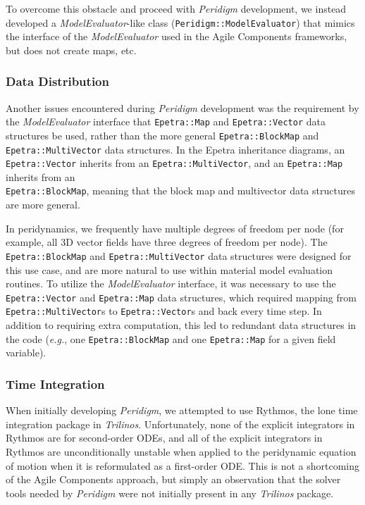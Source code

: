\documentclass[pdf,ps2pdf,12pt,report]{SANDreport}
\theoremstyle{plain}
\theoremstyle{definition}
\theoremstyle{remark}
\numberwithin{equation}{section}
\begin{document}
To overcome this obstacle and proceed with \emph{Peridigm} development, we instead developed a \emph{ModelEvaluator}-like class (\verb"Peridigm::ModelEvaluator") that mimics the interface of the \emph{ModelEvaluator} used in the Agile Components frameworks, but does not create maps, etc.

\subsubsection{Data Distribution}

Another issues encountered during \emph{Peridigm} development was the requirement by the \emph{ModelEvaluator} interface that \verb"Epetra::Map" and \verb"Epetra::Vector" data structures be used, rather than the more general \verb"Epetra::BlockMap" and \verb"Epetra::MultiVector" data structures. In the Epetra inheritance diagrams, an \verb"Epetra::Vector" inherits from an \verb"Epetra::MultiVector", and an \verb"Epetra::Map" inherits from an \\ \verb"Epetra::BlockMap", meaning that the block map and multivector data structures are more general.

In peridynamics, we frequently have multiple degrees of freedom per node (for example, all 3D vector fields have three degrees of freedom per node). The \verb"Epetra::BlockMap" and \verb"Epetra::MultiVector" data structures were designed for this use case, and are more natural to use within material model evaluation routines. To utilize the \emph{ModelEvaluator} interface, it was necessary to use the \verb"Epetra::Vector" and \verb"Epetra::Map" data structures, which required mapping from \verb"Epetra::MultiVector"s to \verb"Epetra::Vector"s and back every time step. In addition to requiring extra computation, this led to redundant data structures in the code (\emph{e.g.}, one \verb"Epetra::BlockMap" and one \verb"Epetra::Map" for a given field variable).

\subsubsection{Time Integration}

When initially developing \emph{Peridigm}, we attempted to use Rythmos, the lone time integration package in \emph{Trilinos}. Unfortunately, none of the explicit integrators in Rythmos are for second-order ODEs, and all of the explicit integrators in Rythmos are unconditionally unstable when applied to the peridynamic equation of motion when it is reformulated as a first-order ODE. This is not a shortcoming of the Agile Components approach, but simply an observation that the solver tools needed by \emph{Peridigm} were not initially present in any \emph{Trilinos} package.
\end{document}
